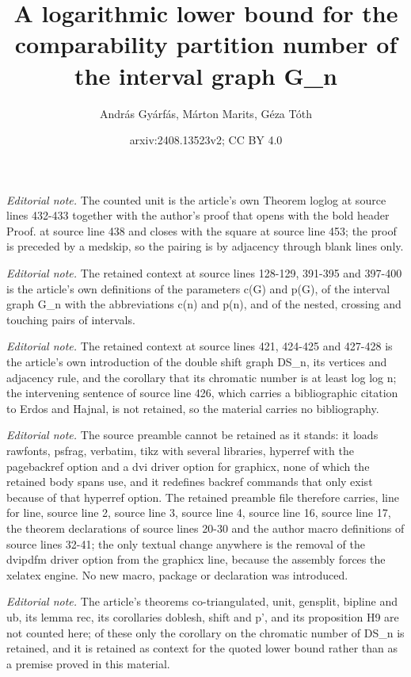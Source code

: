 \documentclass[12pt]{article}
\title{A logarithmic lower bound for the comparability partition number of the interval graph G\_n}
\author{András Gyárfás, Márton Marits, Géza Tóth}
\date{arxiv:2408.13523v2; CC BY 4.0}
\begin{document}
\maketitle
\noindent\textit{Editorial note.} The counted unit is the article's own Theorem loglog at source lines 432-433 together with the author's proof that opens with the bold header Proof. at source line 438 and closes with the square at source line 453; the proof is preceded by a medskip, so the pairing is by adjacency through blank lines only.\par\medskip
\noindent\textit{Editorial note.} The retained context at source lines 128-129, 391-395 and 397-400 is the article's own definitions of the parameters c(G) and p(G), of the interval graph G\_n with the abbreviations c(n) and p(n), and of the nested, crossing and touching pairs of intervals.\par\medskip
\noindent\textit{Editorial note.} The retained context at source lines 421, 424-425 and 427-428 is the article's own introduction of the double shift graph DS\_n, its vertices and adjacency rule, and the corollary that its chromatic number is at least log log n; the intervening sentence of source line 426, which carries a bibliographic citation to Erdos and Hajnal, is not retained, so the material carries no bibliography.\par\medskip
\noindent\textit{Editorial note.} The source preamble cannot be retained as it stands: it loads rawfonts, psfrag, verbatim, tikz with several libraries, hyperref with the pagebackref option and a dvi driver option for graphicx, none of which the retained body spans use, and it redefines backref commands that only exist because of that hyperref option. The retained preamble file therefore carries, line for line, source line 2, source line 3, source line 4, source line 16, source line 17, the theorem declarations of source lines 20-30 and the author macro definitions of source lines 32-41; the only textual change anywhere is the removal of the dvipdfm driver option from the graphicx line, because the assembly forces the xelatex engine. No new macro, package or declaration was introduced.\par\medskip
\noindent\textit{Editorial note.} The article's theorems co-triangulated, unit, gensplit, bipline and ub, its lemma rec, its corollaries doblesh, shift and p', and its proposition H9 are not counted here; of these only the corollary on the chromatic number of DS\_n is retained, and it is retained as context for the quoted lower bound rather than as a premise proved in this material.\par\medskip
\end{document}
